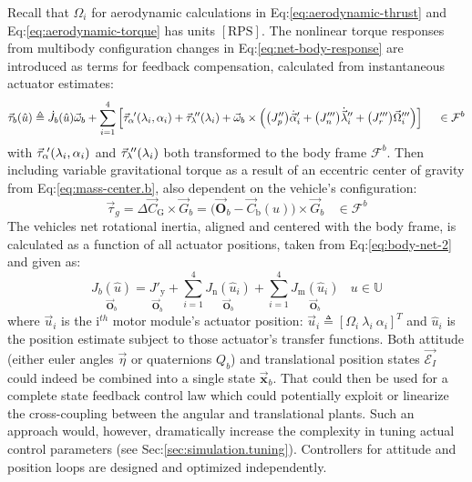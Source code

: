 Recall that $\Omega_i$ for aerodynamic calculations in Eq:\ref{eq:aerodynamic-thrust} and Eq:\ref{eq:aerodynamic-torque} has units $[\text{RPS}]$. The nonlinear torque responses from multibody configuration changes in Eq:\ref{eq:net-body-response} are introduced as terms for  feedback compensation, calculated from instantaneous actuator estimates:
\begin{equation}\label{eq:actuator-torque}
\vec{\tau}_b(\hat{u})\triangleq\dot{J}_b(\hat{u})\vec{\omega}_b+\sum_{i=1}^{4}\Big[\vec{\tau}_\alpha\hspace{-1pt}'(\lambda_i,\alpha_i)+\vec{\tau}_\lambda\hspace{-2pt}''(\lambda_i)+\vec{\omega}_b\times\Big(\big(J_p''\big)\dot{\vec{\alpha}}_i'+\big(J_n'''\big)\dot{\vec{\lambda}}_i''+\big(J_r'''\big)\vec{\Omega}_i'''\Big)\Big]~~~~\in\mathcal{F}^b
\end{equation}
with $\vec{\tau}_\alpha\hspace{-2pt}'(\lambda_i,\alpha_i)$ and $\vec{\tau}_\lambda\hspace{-2pt}''(\lambda_i)$ both transformed to the body frame $\mathcal{F}^b$. Then including variable gravitational torque as a result of an eccentric center of gravity from Eq:\ref{eq:mass-center.b}, also dependent on the vehicle's configuration:
\begin{equation}\label{eq:consolidated-grav-torque}
\vec{\tau}_g=\Delta \vec{C}_\text{G} \times\vec{G}_b=\big(\vec{\mathbf{O}}_b-\vec{C}_\text{b}(u)\big)\times\vec{G}_b~~~~\in\mathcal{F}^b
\end{equation}
The vehicles net rotational inertia, aligned and centered with the body frame, is calculated as a function of all actuator positions, taken from Eq:\ref{eq:body-net-2} and given as:
\begin{equation}
\underset{\vec{\mathbf{O}}_b}{J_b(\hat{u})}=\underset{\vec{\mathbf{O}}_b}{J'_\text{y}}+\sum_{i=1}^{4} \underset{\vec{\mathbf{O}}_b}{J_\text{n}(\hat{u}_i)}+\sum_{i=1}^{4} \underset{\vec{\mathbf{O}}_b}{J_\text{m}(\hat{u}_i)}~~~~u\in\mathbb{U}
\end{equation}
where $\vec{u}_i$ is the $\text{i}^{th}$ motor module's actuator position: $\vec{u}_i\triangleq [\Omega_i~\lambda_i~\alpha_i]^T$ and $\hat{u}_i$ is the position estimate subject to those actuator's transfer functions. Both attitude (either euler angles $\vec{\eta}$ or quaternions $Q_b$) and translational position states $\vec{\mathcal{E}_I}$ could indeed be combined into a single state $\vec{\mathbf{x}}_b$. That could then be used for a complete state feedback control law which could potentially exploit or linearize the cross-coupling between the angular and translational plants. Such an approach would, however, dramatically increase the complexity in tuning actual control parameters (see Sec:\ref{sec:simulation.tuning}). Controllers for attitude and position loops are designed and optimized independently.